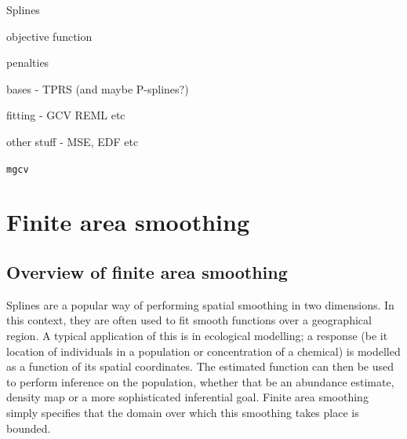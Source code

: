 \bi
\item Splines
\item objective function
\label{GAMobjfcn}
\item penalties
\label{GAMpenalties}
\item bases - TPRS (and maybe P-splines?)
\item fitting - GCV REML etc
\item other stuff - MSE, EDF etc
\item \texttt{mgcv}
%	
%	
%
\ei

\section{Finite area smoothing}

\subsection{Overview of finite area smoothing}

Splines are a popular way of performing spatial smoothing in two dimensions. In this context, they are often used to fit smooth functions over a geographical region. A typical application of this is in ecological modelling; a response (be it location of individuals in a population or concentration of a chemical) is modelled as a function of its spatial coordinates. The estimated function can then be used to perform inference on the population, whether that be an abundance estimate, density map or a more sophisticated inferential goal. Finite area smoothing simply specifies that the domain over which this smoothing takes place is bounded.

